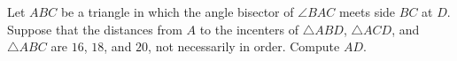Let $ABC$ be a triangle in which the angle bisector of $\angle{BAC}$ meets side $BC$ at $D$. Suppose that the distances from $A$ to the incenters of $\triangle{ABD}$, $\triangle{ACD}$, and $\triangle{ABC}$ are $16$, $18$, and $20$, not necessarily in order. Compute $AD$.